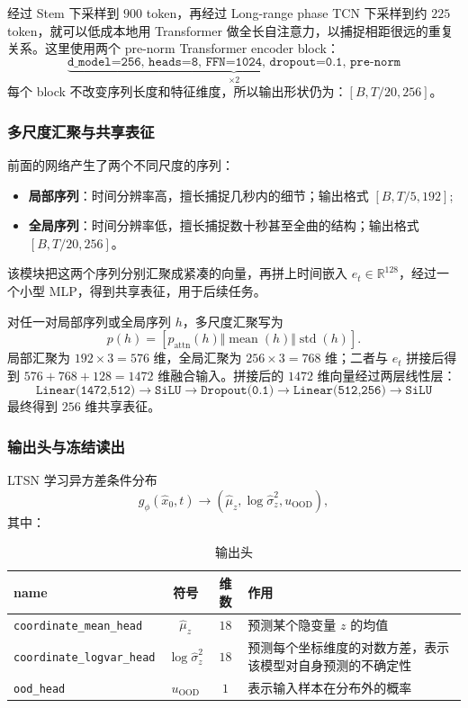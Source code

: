 \documentclass{article}
\begin{document}
经过 Stem 下采样到 $900$ token，再经过 Long-range phase TCN 下采样到约 $225$ token，就可以低成本地用 Transformer 做全长自注意力，以捕捉相距很远的重复关系。这里使用两个 pre-norm Transformer encoder block：
\[\underbrace{\texttt{d\_model=256, heads=8, FFN=1024, dropout=0.1, pre-norm}}_{\times 2}\]
每个 block 不改变序列长度和特征维度，所以输出形状仍为：$[B, T/20, 256]$。

\subsubsection{多尺度汇聚与共享表征}

前面的网络产生了两个不同尺度的序列：
\begin{itemize}
    \item \textbf{局部序列}：时间分辨率高，擅长捕捉几秒内的细节；输出格式 $[B, T/5, 192]$;
    \item \textbf{全局序列}：时间分辨率低，擅长捕捉数十秒甚至全曲的结构；输出格式 $[B, T/20, 256]$。
\end{itemize}
该模块把这两个序列分别汇聚成紧凑的向量，再拼上时间嵌入 $e_t \in \mathbb{R}^{128}$，经过一个小型 MLP，得到共享表征，用于后续任务。

对任一对局部序列或全局序列 $h$，多尺度汇聚写为
\begin{equation}
p(h)=\left[p_{\mathrm{attn}}(h)\Vert\operatorname{mean}(h)
\Vert\operatorname{std}(h)\right].
\end{equation}
局部汇聚为 $192\times3=576$ 维，全局汇聚为 $256\times3=768$ 维；二者与 $e_t$ 拼接后得到 $576+768+128=1472$ 维融合输入。拼接后的 $1472$ 维向量经过两层线性层：
\[\texttt{Linear(1472,512)} \to \texttt{SiLU} \to \texttt{Dropout(0.1)} \to \texttt{Linear(512,256)} \to \texttt{SiLU}\]
最终得到 $256$ 维共享表征。

\subsubsection{输出头与冻结读出}

LTSN 学习异方差条件分布
\begin{equation}
g_{\phi}(\hat{x}_0,t)\longrightarrow
(\hat{\mu}_z,\log\hat{\sigma}_z^2,u_{\mathrm{OOD}}),
\end{equation}
其中：
\begin{table}[htbp]
\centering
\caption{输出头}
\begin{tabular}{lccp{6cm}}
\toprule
name &  符号 & 维数 & 作用  \\
\midrule
\texttt{coordinate\_mean\_head}     & $\hat{\mu}_z$      & $18$    & 预测某个隐变量 $z$ 的均值   \\
\texttt{coordinate\_logvar\_head}   & $\log\hat{\sigma}_z^2$      & $18$    & 预测每个坐标维度的对数方差，表示该模型对自身预测的不确定性   \\
\texttt{ood\_head}     & $u_{\mathrm{OOD}}$      & $1$        & 表示输入样本在分布外的概率     \\
\bottomrule
\end{tabular}
\end{table}
\end{document}
